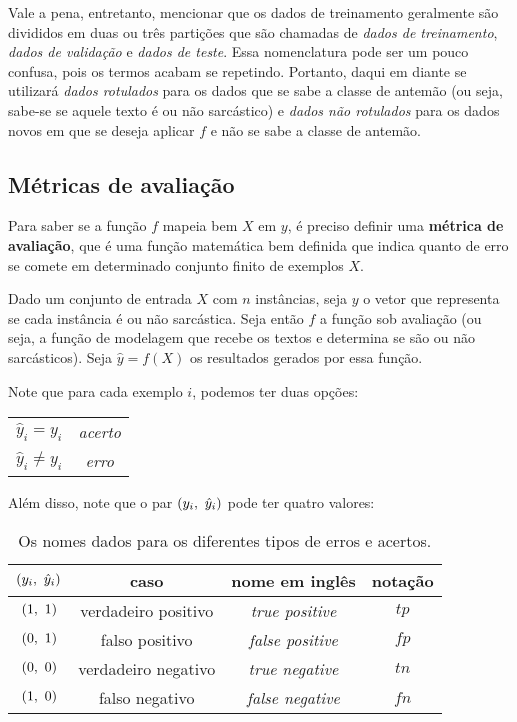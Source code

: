 Vale a pena, entretanto, mencionar que os dados de treinamento geralmente são
divididos em duas ou três partições que são chamadas de \textit{dados de
treinamento}, \textit{dados de validação} e \textit{dados de teste}. Essa
nomenclatura pode ser um pouco confusa, pois os termos acabam se repetindo.
Portanto, daqui em diante se utilizará \textit{dados rotulados} para os dados
que se sabe a classe de antemão (ou seja, sabe-se se aquele texto é ou não
sarcástico) e \textit{dados não rotulados} para os dados novos em que se deseja
aplicar $f$ e não se sabe a classe de antemão.

\subsection{Métricas de avaliação}%
\label{sub:metricas_de_avaliacao}

Para saber se a função $f$ mapeia bem $X$ em $y$, é preciso definir uma
\textbf{métrica de avaliação}, que é uma função matemática bem definida que
indica quanto de erro se comete em determinado conjunto finito de exemplos $X$.

Dado um conjunto de entrada $X$ com $n$ instâncias, seja $y$ o vetor que
representa se cada instância é ou não sarcástica. Seja então $f$ a função sob
avaliação (ou seja, a função de modelagem que recebe os textos e determina se
são ou não sarcásticos). Seja $\hat{y}=f(X)$ os resultados gerados por essa
função.

Note que para cada exemplo $i$, podemos ter duas opções:

\begin{center}
\begin{tabular}{ c c }
  $\hat{y}_i=y_i$ & \textit{acerto} \\
  $\hat{y}_i\neq y_i$ & \textit{erro}
\end{tabular}
\end{center}

Além disso, note que o par $\left( y_i,~\hat{y}_i \right)$ pode ter quatro valores:

\begin{table}[h]
  \centering
  \caption{Os nomes dados para os diferentes tipos de erros e acertos.}
  \label{tab:tabela_casos_error_acerto}
  \begin{tabular}{ c | c c c }
    $\left( y_i,~\hat{y}_i \right)$ & caso & nome em inglês & notação \\
    \hline
    $\left( 1,~1 \right)$ & verdadeiro positivo & \textit{true positive} & $tp$
    \\
    $\left( 0,~1 \right)$ & falso positivo & \textit{false positive} & $fp$
    \\
    $\left( 0,~0 \right)$ & verdadeiro negativo & \textit{true negative} & $tn$
    \\
    $\left( 1,~0 \right)$ & falso negativo & \textit{false negative} & $fn$
  \end{tabular}
\end{table}

